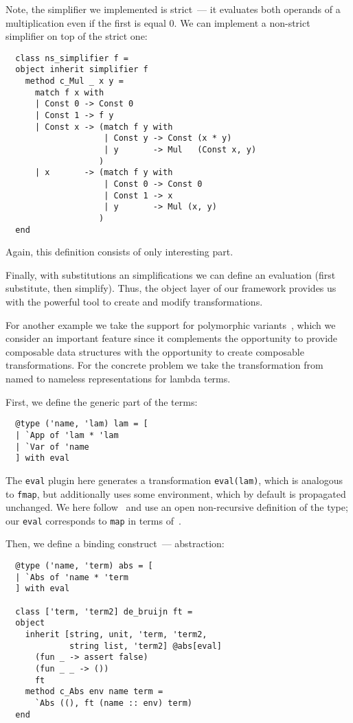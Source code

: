 \documentclass[submission,copyright,creativecommons]{eptcs}
\newcommand{\cd}[1]{\texttt{#1}}
\begin{document}
Note, the simplifier we implemented is strict~--- it evaluates both operands of a multiplication even if the first is equal 0. We can implement
a non-strict simplifier on top of the strict one:

\begin{lstlisting}
  class ns_simplifier f =
  object inherit simplifier f 
    method c_Mul _ x y =
      match f x with
      | Const 0 -> Const 0
      | Const 1 -> f y
      | Const x -> (match f y with                      
                    | Const y -> Const (x * y)
                    | y       -> Mul   (Const x, y)
                   )
      | x       -> (match f y with
                    | Const 0 -> Const 0
                    | Const 1 -> x
                    | y       -> Mul (x, y)
                   )
  end
\end{lstlisting}

Again, this definition consists of only interesting part.

Finally, with substitutions an simplifications we can define an evaluation (first substitute, then simplify). Thus, the object layer of our framework
provides us with the powerful tool to create and modify transformations.

For another example we take the support for polymorphic variants~\cite{PolyVar,PolyVarReuse}, which we consider an important feature since it complements
the opportunity to provide composable data structures with the opportunity to create composable transformations. For the concrete problem we take the
transformation from named to nameless representations for lambda terms.

First, we define the generic part of the terms:

\begin{lstlisting}
  @type ('name, 'lam) lam = [
  | `App of 'lam * 'lam
  | `Var of 'name
  ] with eval
\end{lstlisting}

The \cd{eval} plugin here generates a transformation \cd{eval(lam)}, which is analogous to \cd{fmap}, but additionally uses some environment, which
by default is propagated unchanged. We here follow~\cite{PolyVarReuse} and use an open non-recursive definition of the type; our \cd{eval} corresponds
to \cd{map} in terms of~\cite{Visitors}.

Then, we define a binding construct~--- abstraction:

\begin{lstlisting}
  @type ('name, 'term) abs = [
  | `Abs of 'name * 'term
  ] with eval
  
  class ['term, 'term2] de_bruijn ft =
  object
    inherit [string, unit, 'term, 'term2,
             string list, 'term2] @abs[eval]
      (fun _ -> assert false)
      (fun _ _ -> ())
      ft
    method c_Abs env name term =
      `Abs ((), ft (name :: env) term)
  end
\end{lstlisting}
\end{document}
